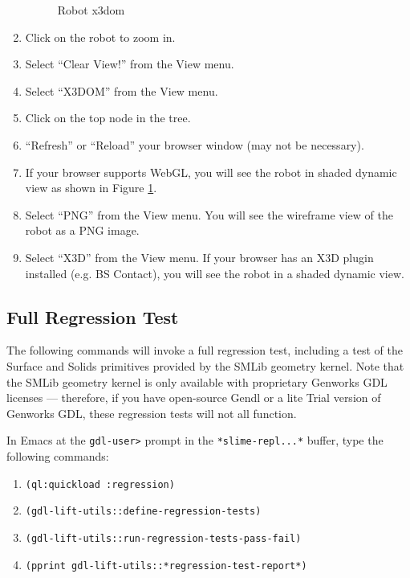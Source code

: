 \documentclass [11pt]{book}
\begin{document}
\begin{enumerate}
\begin{figure}
\caption{Robot x3dom}

\label{fig:tasty-robot-x3dom}

\end{figure}

\item Click on the robot to zoom in.

\item Select ``Clear View!'' from the View menu.

\item Select ``X3DOM'' from the View menu.

\item Click on the top node in the tree.

\item ``Refresh'' or ``Reload'' your browser window (may not be necessary).

\item If your browser supports WebGL, you will see the robot in shaded dynamic view as shown in Figure
\ref{fig:tasty-robot-x3dom}.

\item Select ``PNG'' from the View menu. You will see the
	 wireframe view of the robot as a PNG image.

\item Select ``X3D'' from the View menu. If your browser
has an X3D plugin installed (e.g. BS Contact), you will see the robot
in a shaded dynamic view.

\end{enumerate}



\subsection{Full Regression Test}

\label{subsec:fullregressiontest}

The following commands will invoke a full regression test,
including a test of the Surface and Solids primitives provided by the
SMLib geometry kernel. Note that the SMLib geometry kernel is only
available with proprietary Genworks GDL licenses --- therefore, if you
have open-source Gendl or a lite Trial version of Genworks GDL, these
regression tests will not all function.

In Emacs at the \texttt{gdl-user>} prompt in the \texttt{*slime-repl...*} buffer, type the following commands:

\begin{enumerate}

\item \texttt{(ql:quickload :regression)}

\item \texttt{(gdl-lift-utils::define-regression-tests)}

\item \texttt{(gdl-lift-utils::run-regression-tests-pass-fail)}

\item \texttt{(pprint gdl-lift-utils::*regression-test-report*)}

\end{enumerate}
\end{document}
